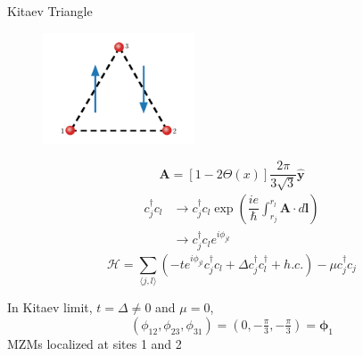 \documentclass[xcolor=dvipsnames,10pt,aspectratio=169]{beamer}
\let\oldhat\hat
\renewcommand{\hat}[1]{\oldhat{\mathbf{#1}}}
\renewcommand{\vec}[1]{\mathbf{#1}}
\newcommand{\ham}{\mathcal{H}}
\newcommand{\cc}{c^{\dagger}}
\newcommand{\de}{\Delta}
\begin{document}
  \begin{frame}{Kitaev Triangle}
    \footnotesize
    \begin{multicols}{2}
      \begin{figure}
        \includegraphics[width=0.4\textwidth]{./figures/3-point-triangle.pdf}
      \end{figure}
      \begin{equation}
        \vec{A} = \left[1-2\Theta(x) \right] \dfrac{2\pi}{3\sqrt{3}} \hat{y}
      \end{equation}
      \pause
      \begin{align}
        \cc_j c_l &\rightarrow \cc_j c_l \exp \left(\dfrac{i e}{\hbar} \int_{r_j}^{r_l} \vec{A} \cdot d\vec{l} \right) \nonumber \\
        &\rightarrow \cc_j c_l e^{i \phi_{jl}}
      \end{align}
      \begin{equation} \label{eq: Peierls chain}
        \ham = \sum_{\langle j,l\rangle} (-t e^{i\phi_{jl}} \cc_j c_l + \de \cc_j\cc_l + h.c.) - \mu \cc_j c_j
      \end{equation}
    \end{multicols}

    \pause
    In Kitaev limit, $t=\de\neq0$ and $\mu=0$,
    \begin{equation}
      (\phi_{12}, \phi_{23}, \phi_{31}) = (0, -\tfrac{\pi}{3}, -\tfrac{\pi}{3}) = \bm\phi_1
    \end{equation}
    MZMs localized at sites 1 and 2

  \end{frame}
\end{document}
